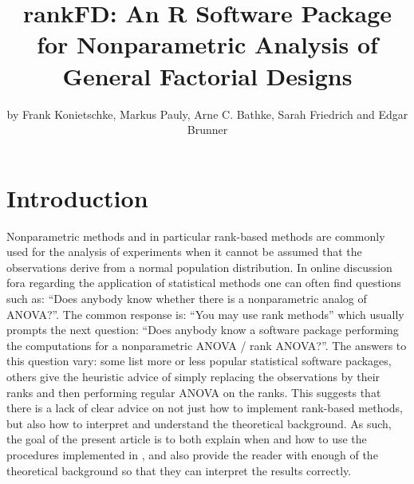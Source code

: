 \title{rankFD: An R Software Package for Nonparametric Analysis of General Factorial Designs}
\author{by Frank Konietschke, Markus Pauly, Arne C. Bathke, Sarah Friedrich and Edgar Brunner}

\maketitle



\section{Introduction} \label{int}
Nonparametric methods and in particular rank-based methods are commonly used 
for the analysis of experiments when it cannot be assumed that the observations 
derive from a normal population distribution. In online discussion fora 
regarding the application of statistical methods one can often find questions 
such as: ``Does anybody know whether there is a nonparametric analog of ANOVA?''. 
The common response is: ``You may use rank methods'' which usually prompts the next 
question: ``Does anybody know a software package performing the computations 
for a nonparametric ANOVA / rank ANOVA?''. The answers to this question vary: some list more or less popular statistical software packages, others give the heuristic advice of simply replacing the observations by their ranks and then performing regular ANOVA on the ranks. This suggests that there is a lack of clear advice on not just how to implement rank-based methods, but also how to interpret and understand the theoretical background. As such, the goal of the present article is to both explain when and how to use the procedures implemented in , and also provide the reader with enough of the theoretical background so that they can interpret the results correctly.

